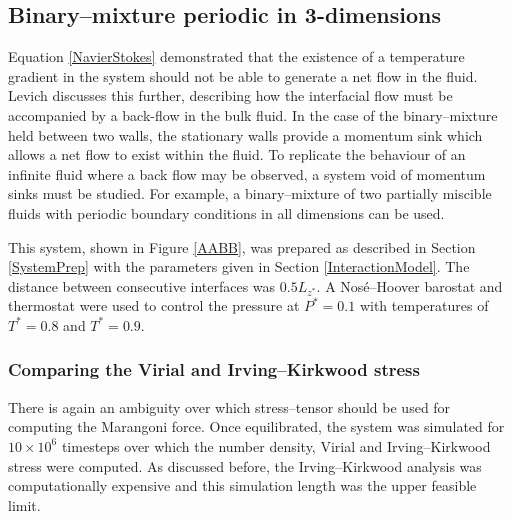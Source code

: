 \subsection{Binary--mixture periodic in 3-dimensions}
Equation \ref{NavierStokes} demonstrated that the existence of a temperature gradient in the system should not be able to generate a net flow in the fluid. 
Levich discusses this further, describing how the interfacial flow must be accompanied by a back-flow in the bulk fluid.\cite{Levich}
In the case of the binary--mixture held between two walls, the stationary walls provide a momentum sink which allows a net flow to exist within the fluid.
To replicate the behaviour of an infinite fluid where a back flow may be observed, a system void of momentum sinks must be studied.
For example, a binary--mixture of two partially miscible fluids with periodic boundary conditions in all dimensions can be used.

This system, shown in Figure \ref{AABB}, was prepared as described in Section \ref{SystemPrep} with the parameters given in Section \ref{InteractionModel}.
The distance between consecutive interfaces was $0.5 L_{z^{*}}$.
A Nos\'{e}--Hoover barostat and thermostat were used to control the pressure at $P^{*} = 0.1$ with temperatures of $T^{*}=0.8$ and $T^{*}=0.9$.

\subsubsection{Comparing the Virial and Irving--Kirkwood stress}
There is again an ambiguity over which stress--tensor should be used for computing the Marangoni force.
Once equilibrated, the system was simulated for $10 \times 10^{6}$ timesteps over which the number density, Virial and Irving--Kirkwood stress were computed.
As discussed before, the Irving--Kirkwood analysis was computationally expensive and this simulation length was the upper feasible limit.
\FloatBarrier

